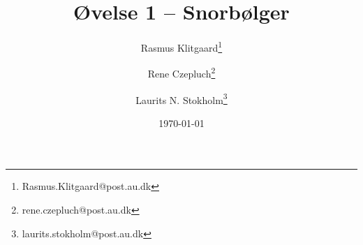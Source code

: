 \documentclass[danish,a4paper,twocolumn, oneside]{memoir}
\title{Øvelse 1 – Snorbølger}
\author{Rasmus Klitgaard\thanks{Rasmus.Klitgaard@post.au.dk}\and Rene Czepluch\thanks{rene.czepluch@post.au.dk} \and  Laurits N. Stokholm\thanks{laurits.stokholm@post.au.dk}}
\date{\today}
\begin{document}
\maketitle
\noindent







\end{document}
